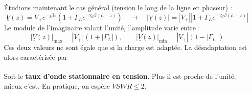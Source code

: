 	Étudions maintenant le cas général (tension le long de la ligne en phaseur) :
	\begin{equation}
	\underline{V}(z) = V_+e^{-j\beta z}(1+\Gamma_Le^{-2j\beta(L-z)})\quad\rightarrow\quad
	|\underline{V}(z)| = |V_+||1+\Gamma_Le^{-2j\beta(L-z)}|
	\end{equation}
	Le module de l'imaginaire valant l'unité, l'amplitude varie entre :
	\begin{equation}
	|\underline{V}(z)|_{\max} = |V_+|(1+|\Gamma_L|),\qquad
	|\underline{V}(z)|_{\min} = |V_+|(1-|\Gamma_L|)
	\end{equation}
	Ces deux valeurs ne sont égale que si la charge est adaptée. La désadaptation est 
	alors caractérisée par\\
	\ \\
	
	Soit le \textbf{taux d'onde stationnaire en tension}. Plus il est proche de l'unité, 
	mieux c'est. En pratique, on espère $VSWR \leq 2$.
	
